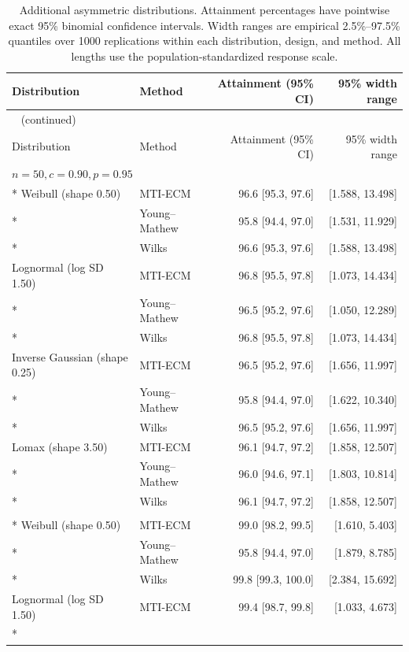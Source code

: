 \begin{longtable}{@{}llrr@{}}
\caption{Additional asymmetric distributions. Attainment percentages have pointwise exact 95\% binomial confidence intervals. Width ranges are empirical 2.5\%--97.5\% quantiles over 1000 replications within each distribution, design, and method. All lengths use the population-standardized response scale.}
\label{tab:supp-mti-added-simulation}\\
\toprule
Distribution & Method & Attainment (95\% CI) & 95\% width range \\
\midrule
\endfirsthead
\multicolumn{4}{l}{\tablename~\thetable{} (continued)}\\
\toprule
Distribution & Method & Attainment (95\% CI) & 95\% width range \\
\midrule
\endhead
\multicolumn{4}{l}{\textbf{\(n=50, c=0.90, p=0.95\)}} \\*
Weibull (shape 0.50) & MTI-ECM & 96.6 [95.3, 97.6] & [1.588, 13.498] \\*
 & Young--Mathew & 95.8 [94.4, 97.0] & [1.531, 11.929] \\*
 & Wilks & 96.6 [95.3, 97.6] & [1.588, 13.498] \\
Lognormal (log SD 1.50) & MTI-ECM & 96.8 [95.5, 97.8] & [1.073, 14.434] \\*
 & Young--Mathew & 96.5 [95.2, 97.6] & [1.050, 12.289] \\*
 & Wilks & 96.8 [95.5, 97.8] & [1.073, 14.434] \\
Inverse Gaussian (shape 0.25) & MTI-ECM & 96.5 [95.2, 97.6] & [1.656, 11.997] \\*
 & Young--Mathew & 95.8 [94.4, 97.0] & [1.622, 10.340] \\*
 & Wilks & 96.5 [95.2, 97.6] & [1.656, 11.997] \\
Lomax (shape 3.50) & MTI-ECM & 96.1 [94.7, 97.2] & [1.858, 12.507] \\*
 & Young--Mathew & 96.0 [94.6, 97.1] & [1.803, 10.814] \\*
 & Wilks & 96.1 [94.7, 97.2] & [1.858, 12.507] \\
\addlinespace[0.4em]
\multicolumn{4}{l}{\textbf{\(n=100, c=0.90, p=0.95\)}} \\*
Weibull (shape 0.50) & MTI-ECM & 99.0 [98.2, 99.5] & [1.610, 5.403] \\*
 & Young--Mathew & 95.8 [94.4, 97.0] & [1.879, 8.785] \\*
 & Wilks & 99.8 [99.3, 100.0] & [2.384, 15.692] \\
Lognormal (log SD 1.50) & MTI-ECM & 99.4 [98.7, 99.8] & [1.033, 4.673] \\*

\end{longtable}
